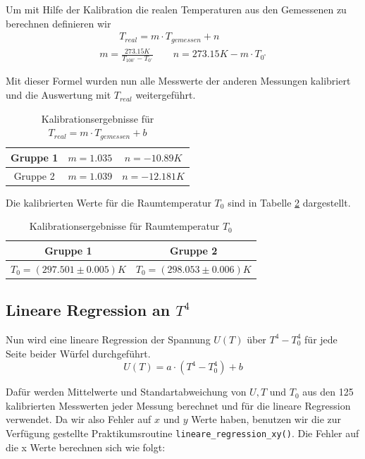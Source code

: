 \documentclass[a4paper, 11pt]{article}
\begin{document}
Um mit Hilfe der Kalibration die realen Temperaturen aus den Gemessenen zu berechnen definieren wir
\begin{eqnarray*}
\qquad T_{real} = m \cdot T_{gemessen} + n \qquad	\\
m = \frac{273.15K}{T_{100^\circ} - T_{0^\circ}}
\qquad
n = 273.15K - m \cdot T_{0^\circ}
\end{eqnarray*}

Mit dieser Formel wurden nun alle Messwerte der anderen Messungen kalibriert und die Auswertung mit $T_{real}$ weitergeführt.

\begin{table}[H]
\centering
	\begin{tabular}{|c|c|c|}
	\hline Gruppe 1 & $m = 1.035$ & $n =-10.89 K$\\
	\hline Gruppe 2 & $m = 1.039 $ & $n = -12.181 K$\\
	\hline
	\end{tabular}
\caption{Kalibrationsergebnisse für $T_{real} = m \cdot T_{gemessen}+b$}
\label{table:KalibrationTreal}
\end{table}

Die kalibrierten Werte für die Raumtemperatur $T_0$ sind in Tabelle \ref{table:KalibrationT0} dargestellt.

\begin{table}[h]
\centering
	\begin{tabular}{|c|c|}
	\hline Gruppe 1& Gruppe 2\\
	\hline $T_0= (297.501 \pm 0.005) K$ & $T_0= (298.053 \pm 0.006)   K$\\
	\hline
	\end{tabular}
\caption{Kalibrationsergebnisse für Raumtemperatur $T_0$}
\label{table:KalibrationT0}
\end{table}

\subsection{Lineare Regression an $T^4$}

Nun wird eine lineare Regression der Spannung $U(T)$ über $T^4-T_0^4$ für jede Seite beider Würfel durchgeführt.
\begin{equation}
U(T) = a \cdot (T^4-T_0^4)+b
\end{equation} 

Dafür werden Mittelwerte und Standartabweichung von $U,T$ und $T_0$ aus den 125 kalibrierten Messwerten jeder Messung berechnet und für die lineare Regression verwendet.
Da wir also Fehler auf $x$ und $y$ Werte haben, benutzen wir die zur Verfügung gestellte Praktikumsroutine \texttt{lineare\_regression\_xy()}. 
Die Fehler auf die x Werte berechnen sich wie folgt:
\end{document}
